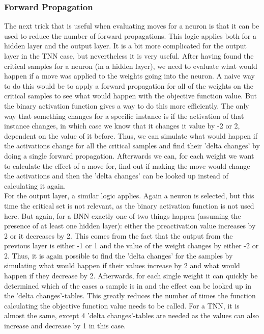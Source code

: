 \subsubsection{Forward Propagation}
The next trick that is useful when evaluating moves for a neuron is that it can be used to reduce the number of forward propagations. This logic applies both for a hidden layer and the output layer. It is a bit more complicated for the output layer in the TNN case, but nevertheless it is very useful. After having found the critical samples for a neuron (in a hidden layer), we need to evaluate what would happen if a move was applied to the weights going into the neuron. A naive way to do this would be to apply a forward propagation for all of the weights on the critical samples to see what would happen with the objective function value. But the binary activation function gives a way to do this more efficiently. The only way that something changes for a specific instance is if the activation of that instance changes, in which case we know that it changes it value by -2 or 2, dependent on the value of it before. Thus, we can simulate what would happen if the activations change for all the critical samples and find their 'delta changes' by doing a single forward propagation. Afterwards we can, for each weight we want to calculate the effect of a move for, find out if making the move would change the activations and then the 'delta changes' can be looked up instead of calculating it again. \\

\noindent For the output layer, a similar logic applies. Again a neuron is selected, but this time the critical set is not relevant, as the binary activation function is not used here. But again, for a BNN exactly one of two things happen (assuming the presence of at least one hidden layer): either the preactivation value increases by 2 or it decreases by 2. This comes from the fact that the output from the previous layer is either -1 or 1 and the value of the weight changes by either -2 or 2. Thus, it is again possible to find the 'delta changes' for the samples by simulating what would happen if their values increase by 2 and what would happen if they decrease by 2. Afterwards, for each single weight it can quickly be determined which of the cases a sample is in and the effect can be looked up in the 'delta changes'-tables. This greatly reduces the number of times the function calculating the objective function value needs to be called. For a TNN, it is almost the same, except 4 'delta changes'-tables are needed as the values can also increase and decrease by 1 in this case. 

